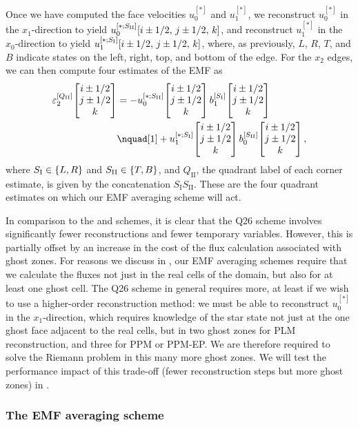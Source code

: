 Once we have computed the face velocities $u_0^{[*]}$ and $u_1^{[*]}$, we reconstruct $u_{0}^{[*]}$ in the $x_1$-direction to yield $u_{0}^{[*;S_\mathrm{II}]}\!\left[ i \pm 1/2,\,j \pm 1/2,\,k \right]$, and reconstruct $u_{1}^{[*]}$ in the $x_0$-direction to yield $u_{1}^{[*;S_\mathrm{I}]}\!\left[ i \pm 1/2,\,j \pm 1/2,\,k \right]$, where, as previously, $L$, $R$, $T$, and $B$ indicate states on the left, right, top, and bottom of the edge. For the $x_2$ edges, we can then compute four estimates of the EMF as
\begin{align}
    \varepsilon_{2}^{[Q_\mathrm{II}]}\EvalAtV{i \pm 1/2}{j \pm 1/2}{k}
        &= -u_{0}^{[*;S_\mathrm{II}]}\EvalAtV{i \pm 1/2}{j \pm 1/2}{k}
            b_{1}^{[S_\mathrm{I}]}\EvalAtV{i \pm 1/2}{j \pm 1/2}{k}
        \nonumber \\
        &\nquad[1]
            + u_{1}^{[*;S_\mathrm{I}]}\EvalAtV{i \pm 1/2}{j \pm 1/2}{k}
            b_{0}^{[S_\mathrm{II}]}\EvalAtV{i \pm 1/2}{j \pm 1/2}{k}
    , \label{eqn:emf:q26}
\end{align}
where $S_\mathrm{I} \in \left\{ L, R \right\}$ and $S_\mathrm{II} \in \left\{ T, B \right\}$, and $Q_\mathrm{II}$, the quadrant label of each corner estimate, is given by the concatenation $S_\mathrm{I} S_\mathrm{II}$. These are the four quadrant estimates on which our EMF averaging scheme will act.

In comparison to the  and  schemes, it is clear that the Q26 scheme involves significantly fewer reconstructions and fewer temporary variables. However, this is partially offset by an increase in the cost of the flux calculation associated with ghost zones. For reasons we discuss in , our EMF averaging schemes require that we calculate the fluxes not just in the real cells of the domain, but also for at least one ghost cell. The Q26 scheme in general requires more, at least if we wish to use a higher-order reconstruction method: we must be able to reconstruct $u_{0}^{[*]}$ in the $x_1$-direction, which requires knowledge of the star state not just at the one ghost face adjacent to the real cells, but in two ghost zones for PLM reconstruction, and three for PPM or PPM-EP. We are therefore required to solve the Riemann problem in this many more ghost zones. We will test the performance impact of this trade-off (fewer reconstruction steps but more ghost zones) in .

\subsubsection{The EMF averaging scheme}
\label{sec:methods:emf:averaging}

